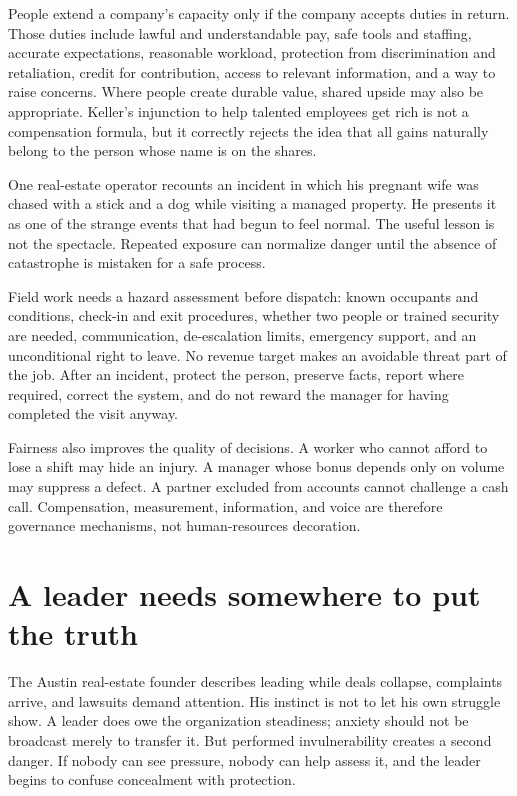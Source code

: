 People extend a company's capacity only if the company accepts duties in
return. Those duties include lawful and understandable pay, safe tools and
staffing, accurate expectations, reasonable workload, protection from
discrimination and retaliation, credit for contribution, access to relevant
information, and a way to raise concerns. Where people create durable value,
shared upside may also be appropriate. Keller's injunction to help talented
employees get rich is not a compensation formula, but it correctly rejects the
idea that all gains naturally belong to the person whose name is on the shares.

One real-estate operator recounts an incident in which his pregnant wife was
chased with a stick and a dog while visiting a managed property. He presents it
as one of the strange events that had begun to feel normal. The useful lesson
is not the spectacle. Repeated exposure can normalize danger until the absence
of catastrophe is mistaken for a safe process.

Field work needs a hazard assessment before dispatch: known occupants and
conditions, check-in and exit procedures, whether two people or trained
security are needed, communication, de-escalation limits, emergency support,
and an unconditional right to leave. No revenue target makes an avoidable
threat part of the job. After an incident, protect the person, preserve facts,
report where required, correct the system, and do not reward the manager for
having completed the visit anyway.

Fairness also improves the quality of decisions. A worker who cannot afford to
lose a shift may hide an injury. A manager whose bonus depends only on volume
may suppress a defect. A partner excluded from accounts cannot challenge a
cash call. Compensation, measurement, information, and voice are therefore
governance mechanisms, not human-resources decoration.

\section{A leader needs somewhere to put the truth}

The Austin real-estate founder describes leading while deals collapse,
complaints arrive, and lawsuits demand attention. His instinct is not to let
his own struggle show. A leader does owe the organization steadiness; anxiety
should not be broadcast merely to transfer it. But performed invulnerability
creates a second danger. If nobody can see pressure, nobody can help assess it,
and the leader begins to confuse concealment with protection.


